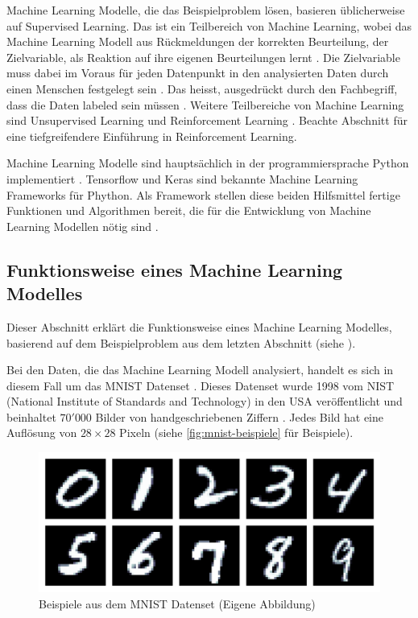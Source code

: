 Machine Learning Modelle, die das Beispielproblem lösen, basieren üblicherweise
auf Supervised Learning. Das ist ein Teilbereich von Machine Learning, wobei das
Machine Learning Modell aus Rückmeldungen der korrekten Beurteilung, der
Zielvariable, als Reaktion auf ihre eigenen Beurteilungen lernt
\cite{noauthor_was_nodate-1}. Die Zielvariable muss dabei im Voraus für jeden
Datenpunkt in den analysierten Daten durch einen Menschen festgelegt sein
\cite{trahasich_31_2020}. Das heisst, ausgedrückt durch den Fachbegriff, dass
die Daten labeled sein müssen \cite{noauthor_21_nodate}. Weitere Teilbereiche
von Machine Learning sind Unsupervised Learning und Reinforcement Learning
\cite{arora_supervised_2020}. Beachte Abschnitt  für eine
tiefgreifendere Einführung in Reinforcement Learning.

Machine Learning Modelle sind hauptsächlich in der programmiersprache Python
implementiert \cite{sadie_bennett_why_2019}. Tensorflow und Keras sind bekannte
Machine Learning Frameworks für Phython. Als Framework stellen diese beiden
Hilfsmittel fertige Funktionen und Algorithmen bereit, die für die Entwicklung
von Machine Learning Modellen nötig sind
\cite{noauthor_tensorflow_2015}\cite{noauthor_keras_2015}.


\subsection{Funktionsweise eines Machine Learning Modelles}\label{sub:t_ml_func}
Dieser Abschnitt erklärt die Funktionsweise eines Machine Learning Modelles,
basierend auf dem Beispielproblem aus dem letzten Abschnitt (siehe ). 

Bei den Daten, die das Machine Learning Modell analysiert, handelt es sich in
diesem Fall um das MNIST Datenset \cite{noauthor_mnist_nodate}. Dieses Datenset
wurde 1998 vom NIST (National Institute of Standards and Technology) in den USA
veröffentlicht und beinhaltet $70'000$ Bilder von handgeschriebenen Ziffern
\cite{noauthor_mnis_nodate}. Jedes Bild hat eine Auflösung von $28\times28$
Pixeln (siehe \autoref{fig:mnist-beispiele} für Beispiele).

\begin{figure}[!ht]
    \centering
    \includegraphics[width=\textwidth]{images/theorie/mnist-beispiele.png}
    \caption{Beispiele aus dem MNIST Datenset (Eigene Abbildung)}
    \label{fig:mnist-beispiele}
\end{figure}

